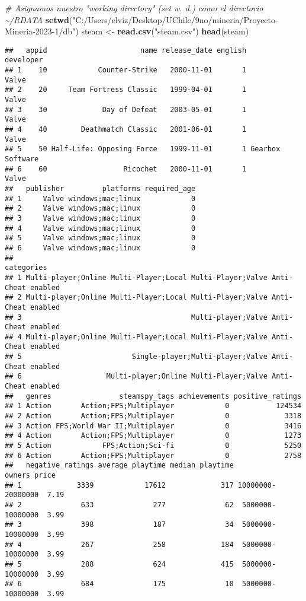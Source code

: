 \documentclass[
]{article}
\newenvironment{Shaded}{\begin{snugshade}}{\end{snugshade}}
\newcommand{\CommentTok}[1]{\textcolor[rgb]{0.56,0.35,0.01}{\textit{#1}}}
\newcommand{\FunctionTok}[1]{\textcolor[rgb]{0.13,0.29,0.53}{\textbf{#1}}}
\newcommand{\NormalTok}[1]{#1}
\newcommand{\OtherTok}[1]{\textcolor[rgb]{0.56,0.35,0.01}{#1}}
\newcommand{\StringTok}[1]{\textcolor[rgb]{0.31,0.60,0.02}{#1}}
\begin{document}
\begin{Shaded}
\begin{Highlighting}[]
\CommentTok{\# Asignamos nuestro "working directory" (set w. d.) como el directorio \textasciitilde{}/RDATA}
\FunctionTok{setwd}\NormalTok{(}\StringTok{"C:/Users/elviz/Desktop/UChile/9no/mineria/Proyecto{-}Mineria{-}2023{-}1/db"}\NormalTok{)}
\NormalTok{steam }\OtherTok{\textless{}{-}} \FunctionTok{read.csv}\NormalTok{(}\StringTok{"steam.csv"}\NormalTok{)}
\FunctionTok{head}\NormalTok{(steam)}
\end{Highlighting}
\end{Shaded}

\begin{verbatim}
##   appid                      name release_date english        developer
## 1    10            Counter-Strike   2000-11-01       1            Valve
## 2    20     Team Fortress Classic   1999-04-01       1            Valve
## 3    30             Day of Defeat   2003-05-01       1            Valve
## 4    40        Deathmatch Classic   2001-06-01       1            Valve
## 5    50 Half-Life: Opposing Force   1999-11-01       1 Gearbox Software
## 6    60                  Ricochet   2000-11-01       1            Valve
##   publisher         platforms required_age
## 1     Valve windows;mac;linux            0
## 2     Valve windows;mac;linux            0
## 3     Valve windows;mac;linux            0
## 4     Valve windows;mac;linux            0
## 5     Valve windows;mac;linux            0
## 6     Valve windows;mac;linux            0
##                                                                     categories
## 1 Multi-player;Online Multi-Player;Local Multi-Player;Valve Anti-Cheat enabled
## 2 Multi-player;Online Multi-Player;Local Multi-Player;Valve Anti-Cheat enabled
## 3                                        Multi-player;Valve Anti-Cheat enabled
## 4 Multi-player;Online Multi-Player;Local Multi-Player;Valve Anti-Cheat enabled
## 5                          Single-player;Multi-player;Valve Anti-Cheat enabled
## 6                    Multi-player;Online Multi-Player;Valve Anti-Cheat enabled
##   genres                steamspy_tags achievements positive_ratings
## 1 Action       Action;FPS;Multiplayer            0           124534
## 2 Action       Action;FPS;Multiplayer            0             3318
## 3 Action FPS;World War II;Multiplayer            0             3416
## 4 Action       Action;FPS;Multiplayer            0             1273
## 5 Action            FPS;Action;Sci-fi            0             5250
## 6 Action       Action;FPS;Multiplayer            0             2758
##   negative_ratings average_playtime median_playtime            owners price
## 1             3339            17612             317 10000000-20000000  7.19
## 2              633              277              62  5000000-10000000  3.99
## 3              398              187              34  5000000-10000000  3.99
## 4              267              258             184  5000000-10000000  3.99
## 5              288              624             415  5000000-10000000  3.99
## 6              684              175              10  5000000-10000000  3.99
\end{verbatim}
\end{document}
